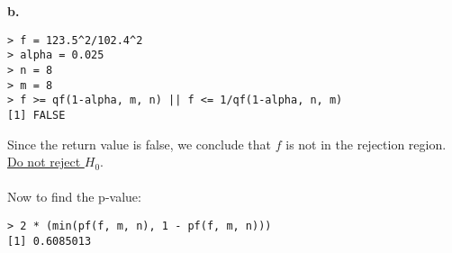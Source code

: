 \documentclass[12pt]{report}
\begin{document}
\pagebreak
\noindent \textbf{b.}
\begin{verbatim}
> f = 123.5^2/102.4^2
> alpha = 0.025
> n = 8
> m = 8
> f >= qf(1-alpha, m, n) || f <= 1/qf(1-alpha, n, m) 
[1] FALSE
\end{verbatim}

\noindent Since the return value is false, we conclude that $f$ is not in the rejection region. \underline{Do not reject $H_0$}.\\\\Now to find the p-value:
\begin{verbatim}
> 2 * (min(pf(f, m, n), 1 - pf(f, m, n)))
[1] 0.6085013
\end{verbatim}
\end{document}
